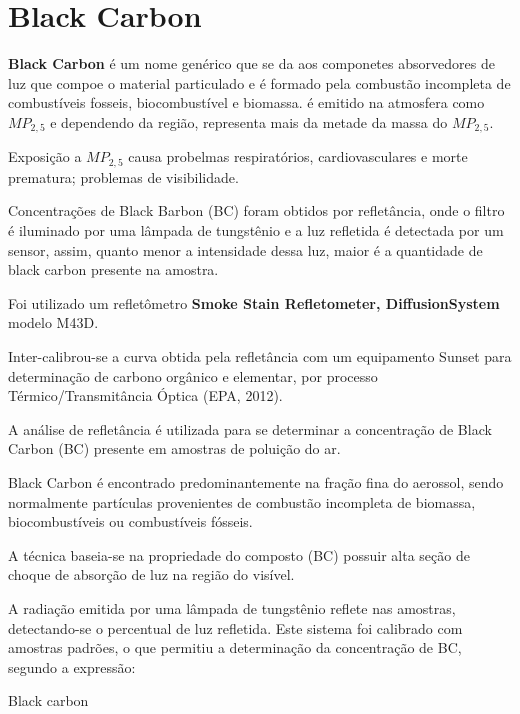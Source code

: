 \section{Black Carbon}

\textbf{Black Carbon} é um nome genérico que se da aos componetes
absorvedores de luz que compoe o material particulado e é formado pela combustão
incompleta de combustíveis fosseis, biocombustível e biomassa. 
é emitido na atmosfera como $MP_{2,5}$ e dependendo da região, representa 
mais da metade da massa do $MP_{2,5}$.


Exposição a $MP_{2,5}$  causa probelmas respiratórios, cardiovasculares e morte prematura; 
problemas de visibilidade. 



Concentrações de Black Barbon (BC) foram obtidos por  refletância, 
onde o filtro é iluminado por uma lâmpada de tungstênio e a luz refletida é 
detectada por um sensor, assim, quanto menor a intensidade dessa luz,
 maior é a quantidade de black carbon presente na amostra. 

Foi utilizado um refletômetro 
\textbf{Smoke Stain Refletometer, DiffusionSystem} modelo M43D. 

Inter-calibrou-se a curva obtida pela refletância com um equipamento 
Sunset para determinação de carbono orgânico e elementar, 
por processo Térmico/Transmitância Óptica (EPA, 2012).

A análise de refletância  é utilizada para se determinar a concentração 
de Black Carbon (BC) presente em amostras de poluição do ar. 

Black Carbon é encontrado  predominantemente na fração fina do aerossol, 
sendo normalmente partículas provenientes de combustão incompleta de biomassa, 
biocombustíveis ou combustíveis fósseis. 

A técnica baseia-se na propriedade do composto (BC) possuir alta seção de 
choque de absorção de luz na região do visível. 

A radiação emitida por uma lâmpada de tungstênio reflete nas amostras, 
detectando-se o percentual de luz refletida. Este sistema foi calibrado 
com amostras padrões, o que permitiu a determinação da concentração de BC, 
segundo a expressão:

Black carbon 

